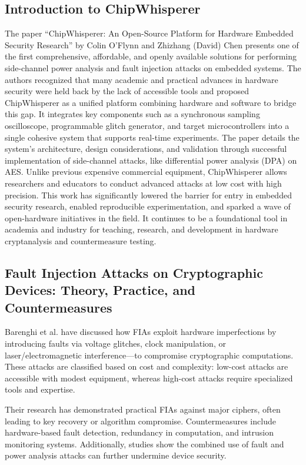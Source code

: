 \subsection*{Introduction to ChipWhisperer \cite{flynnpaper}}
The paper “ChipWhisperer: An Open-Source Platform for Hardware Embedded Security Research” by Colin O’Flynn and Zhizhang (David) Chen presents one of the first comprehensive, affordable, and openly available solutions for performing side-channel power analysis and fault injection attacks on embedded systems. The authors recognized that many academic and practical advances in hardware security were held back by the lack of accessible tools and proposed ChipWhisperer as a unified platform combining hardware and software to bridge this gap. It integrates key components such as a synchronous sampling oscilloscope, programmable glitch generator, and target microcontrollers into a single cohesive system that supports real-time experiments. The paper details the system’s architecture, design considerations, and validation through successful implementation of side-channel attacks, like differential power analysis (DPA) on AES. Unlike previous expensive commercial equipment, ChipWhisperer allows researchers and educators to conduct advanced attacks at low cost with high precision. This work has significantly lowered the barrier for entry in embedded security research, enabled reproducible experimentation, and sparked a wave of open-hardware initiatives in the field. It continues to be a foundational tool in academia and industry for teaching, research, and development in hardware cryptanalysis and countermeasure testing.


\subsection*{Fault Injection Attacks on Cryptographic Devices: Theory, Practice, and Countermeasures \cite{6178001}}
Barenghi et al. have discussed how FIAs exploit hardware imperfections by introducing faults via voltage glitches, clock manipulation, or laser/electromagnetic interference—to compromise cryptographic computations. These attacks are classified based on cost and complexity: low-cost attacks are accessible with modest equipment, whereas high-cost attacks require specialized tools and expertise.

Their research has demonstrated practical FIAs against major ciphers, often leading to key recovery or algorithm compromise. Countermeasures include hardware-based fault detection, redundancy in computation, and intrusion monitoring systems. Additionally, studies show the combined use of fault and power analysis attacks can further undermine device security.

